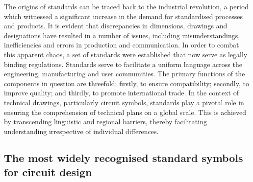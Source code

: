 %
The origins of standards can be traced back to the industrial revolution, a period which witnessed a significant increase in the demand for standardised processes and products. It is evident that discrepancies in dimensions, drawings and designations have resulted in a number of issues, including misunderstandings, inefficiencies and errors in production and communication. In order to combat this apparent chaos, a set of standards were established that now serve as legally binding regulations.\newline
Standards serve to facilitate a uniform language across the engineering, manufacturing and user communities. The primary functions of the components in question are threefold: firstly, to ensure compatibility; secondly, to improve quality; and thirdly, to promote international trade. In the context of technical drawings, particularly circuit symbols, standards play a pivotal role in ensuring the comprehension of technical plans on a global scale. This is achieved by transcending linguistic and regional barriers, thereby facilitating understanding irrespective of individual differences.
\subsection*{The most widely recognised standard symbols for circuit design}

